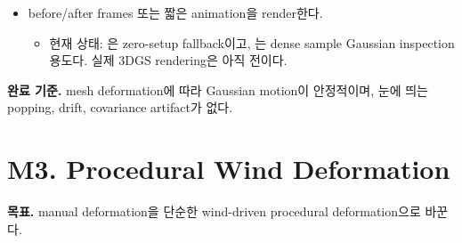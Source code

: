 \documentclass[10pt]{article}
\newcommand{\progress}{\textcolor{ProgressBlue}{[{\raisebox{0.1ex}{\(\sim\)}}]}}
\newcommand{\code}[1]{\texttt{#1}}
\begin{document}
\begin{itemize}
\begin{itemize}
      \item face surface는 opaque로 표시한다.
      \item back face culling은 기본 on이며, camera side에 따라 front-face winding을 \code{ccw}/\code{cw}로 보정한다. UI toggle / \code{C} key / \code{--no-backface-culling}으로 끌 수 있다.
      \item camera rotation은 yaw/pitch/roll 3축을 지원한다. left drag는 yaw/pitch, right drag 또는 \code{Shift}+left drag는 roll, UI slider와 arrow/\code{Z}/\code{X} key도 지원한다.
      \item transported GS ellipsoid surface는 UI toggle / \code{E} key / \code{--no-gaussian-ellipsoids}로 켜고 끌 수 있다.
      \item transported GS anisotropic frame axes는 UI toggle / \code{O} key / \code{--show-gaussian-frames}로 켜고 끌 수 있다.
      \item \code{--ply} CLI와 Tk control panel의 \code{load PLY...} / \code{use sample GS} 버튼으로 M1 synthetic PLY와 built-in sample GS를 전환할 수 있다.
      \item PLY mode는 \code{--ply-proxy-mode occupancy}를 기본으로 사용해 leaf 영역 밖 rectangular mesh를 줄인다.
    \end{itemize}
  \item[\progress] before/after frames 또는 짧은 animation을 render한다.
    \begin{itemize}
      \item 현재 상태: 은 zero-setup fallback이고, 는 dense sample Gaussian inspection 용도다. 실제 3DGS rendering은 아직 전이다.
    \end{itemize}
\end{itemize}

\textbf{완료 기준.} mesh deformation에 따라 Gaussian motion이 안정적이며, 눈에 띄는 popping, drift, covariance artifact가 없다.

\section{M3. Procedural Wind Deformation}

\textbf{목표.} manual deformation을 단순한 wind-driven procedural deformation으로 바꾼다.
\end{document}
